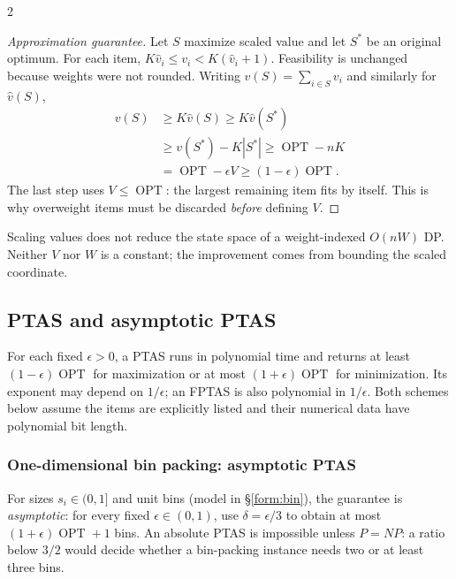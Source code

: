 \documentclass[8pt]{extarticle}
\theoremstyle{definition}
\newcommand{\OPT}{\operatorname{OPT}}
\begin{document}
\begin{multicols*}{2}
\begin{proof}[Approximation guarantee]
Let $S$ maximize scaled value and let $S^*$ be an original optimum. For each item,
$K\hat v_i\le v_i<K(\hat v_i+1)$. Feasibility is unchanged because weights were not rounded.
Writing $v(S)=\sum_{i\in S}v_i$ and similarly for $\hat v(S)$,
\begin{align*}
v(S)&\ge K\hat v(S)\ge K\hat v(S^*)\\
&\ge v(S^*)-K|S^*|\ge\OPT-nK\\
&=\OPT-\epsilon V\ge(1-\epsilon)\OPT.
\end{align*}
The last step uses $V\le\OPT$: the largest remaining item fits by itself. This is why
overweight items must be discarded \emph{before} defining $V$.
\end{proof}
Scaling values does not reduce the state space of a weight-indexed $O(nW)$ DP. Neither
$V$ nor $W$ is a constant; the improvement comes from bounding the scaled coordinate.

\subsection{PTAS and asymptotic PTAS}\label{gre:ptas}
For each fixed $\epsilon>0$, a PTAS runs in polynomial time and returns at least
$(1-\epsilon)\OPT$ for maximization or at most $(1+\epsilon)\OPT$ for
minimization. Its exponent may depend on $1/\epsilon$; an FPTAS is also
polynomial in $1/\epsilon$. Both schemes below assume the items are explicitly
listed and their numerical data have polynomial bit length.

\subsubsection{One-dimensional bin packing: asymptotic PTAS}\label{gre:bin-aptas}
For sizes $s_i\in(0,1]$ and unit bins (model in \S\ref{form:bin}), the
guarantee is \emph{asymptotic}: for every fixed $\epsilon\in(0,1)$, use
$\delta=\epsilon/3$ to obtain at most $(1+\epsilon)\OPT+1$ bins.
An absolute PTAS is impossible unless $P=NP$: a ratio below $3/2$
would decide whether a bin-packing instance needs two or at least three bins.


\end{multicols*}
\end{document}
